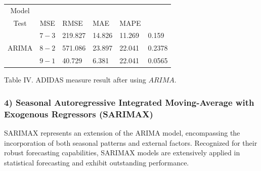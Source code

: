 \documentclass[conference]{IEEEtran}
\begin{document}
{\begin{table}[H]
\centering
\begin{tabularx}{\columnwidth}{|c|c|X|X|X|X|}
\hline
Model & \begin{tabular}{c}
Train- \\
Test
\end{tabular} & MSE & RMSE & MAE & MAPE \\
\hline
\multirow{3}{*}{ARIMA} & $7-3$ & 219.827 & 14.826 & 11.269 & 0.159 \\
\cline{2-6}
 & $8-2$ & 571.086 & 23.897 & 22.041 & 0.2378 \\
\cline{2-6}
 & $9-1$ & 40.729 & 6.381 & 22.041 & 0.0565 \\
\hline
\end{tabularx}
\end{table}

Table IV. ADIDAS measure result after using $ARIMA$.
\newline
\subsubsection*{\textbf{4) Seasonal Autoregressive Integrated Moving-Average with Exogenous Regressors (SARIMAX)}}
SARIMAX represents an extension of the ARIMA model, encompassing the incorporation of both seasonal patterns and external factors. Recognized for their robust forecasting capabilities, SARIMAX models are extensively applied in statistical forecasting and exhibit outstanding performance.

}
\end{document}
